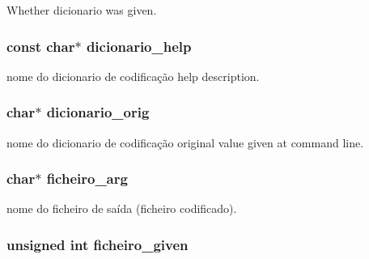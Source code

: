 Whether dicionario was given. 

\subsubsection[{dicionario\_\-help}]{\setlength{\rightskip}{0pt plus 5cm}const char$\ast$ {\bf dicionario\_\-help}}\label{da/dad/structgengetopt__args__info_ab0d5e43d5d1cb5341d15dfdc081522c3}


nome do dicionario de codificação help description. 

\subsubsection[{dicionario\_\-orig}]{\setlength{\rightskip}{0pt plus 5cm}char$\ast$ {\bf dicionario\_\-orig}}\label{da/dad/structgengetopt__args__info_a0945102983523f5ef84885fc7f75af32}


nome do dicionario de codificação original value given at command line. 

\subsubsection[{ficheiro\_\-arg}]{\setlength{\rightskip}{0pt plus 5cm}char$\ast$ {\bf ficheiro\_\-arg}}\label{da/dad/structgengetopt__args__info_a3862a6f82fda55a9614407fbaf314035}


nome do ficheiro de saída (ficheiro codificado). 

\subsubsection[{ficheiro\_\-given}]{\setlength{\rightskip}{0pt plus 5cm}unsigned int {\bf ficheiro\_\-given}}\label{da/dad/structgengetopt__args__info_ae707140f7add0c90b6d33212db6d0f73}


